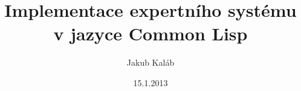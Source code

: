 \documentclass[12pt]{article}
\title{Implementace expertního systému v jazyce Common Lisp}
\author{Jakub Kaláb}
\date{15.1.2013}
\begin{document}
\maketitle
\renewcommand\listoflistingscaption{Seznam příkladů}
\renewcommand\listingscaption{Příklad}
\listoflistings
{}






\clearpage
\renewcommand\refname{Seznam použité literatury}



\appendix

\end{document}
